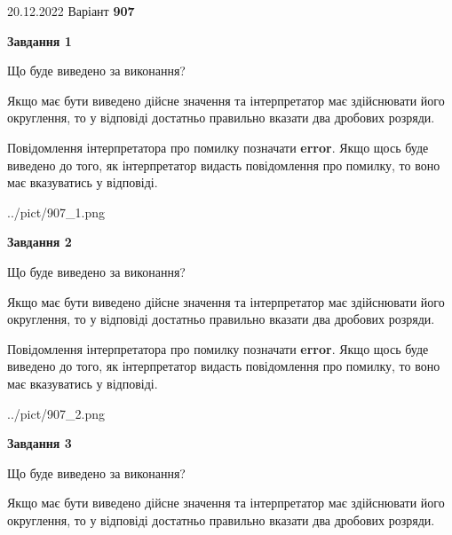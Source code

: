 \documentclass[12pt, ukrainian]{article}
\begin{document}
{20.12.2022 Варіант \No \textbf { 907 }\par}
{
\begin {Large}

{\begin {center}\textbf{Завдання 1}\end {center}}\par
Що буде виведено за виконання? \par

Якщо має бути виведено дійсне значення та інтерпретатор має здійснювати його округлення, 
то у відповіді достатньо правильно вказати два дробових розряди.

Повідомлення інтерпретатора про помилку позначати \textbf{error}.
Якщо щось буде виведено до того, як інтерпретатор видасть повідомлення про помилку, 
то воно має вказуватись у відповіді. \par

\begin{center}
	{../pict/907_1.png}
\end{center}
\newpage

{\begin {center}\textbf{Завдання 2}\end {center}}\par
Що буде виведено за виконання? \par

Якщо має бути виведено дійсне значення та інтерпретатор має здійснювати його округлення, 
то у відповіді достатньо правильно вказати два дробових розряди.

Повідомлення інтерпретатора про помилку позначати \textbf{error}.
Якщо щось буде виведено до того, як інтерпретатор видасть повідомлення про помилку, 
то воно має вказуватись у відповіді. \par

\begin{center}
	{../pict/907_2.png}
\end{center}
\newpage

{\begin {center}\textbf{Завдання 3}\end {center}}\par
Що буде виведено за виконання? \par

Якщо має бути виведено дійсне значення та інтерпретатор має здійснювати його округлення, 
то у відповіді достатньо правильно вказати два дробових розряди.


\end{Large}}
\end{document}

